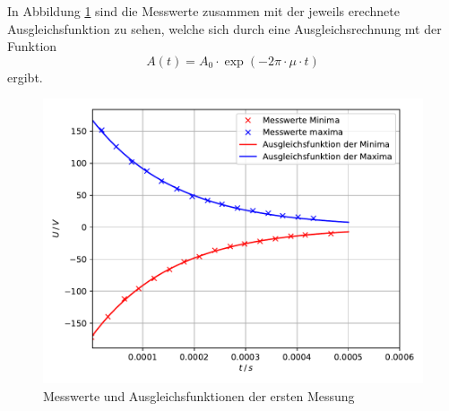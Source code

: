 \noindent In Abbildung \ref{fig:plot1} sind die Messwerte zusammen mit der jeweils erechnete Ausgleichsfunktion
zu sehen, welche sich durch eine Ausgleichsrechnung mt der Funktion
\begin{equation}
  A(t)= A_0 \cdot \exp{(-2\pi \cdot \mu \cdot t)}
\end{equation}
ergibt.
\begin{figure}[H]
  \centering
  \includegraphics{plot1.pdf}
  \caption{Messwerte und Ausgleichsfunktionen der ersten Messung}
  \label{fig:plot1}
\end{figure}

